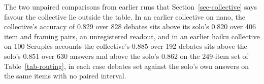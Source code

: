 The two unpaired comparisons from earlier runs that Section~\ref{sec-collective} says
favour the collective lie outside the table.
In an earlier collective on nano, the
collective's accuracy of 0.829 over 828 debates sits above its solo's 0.820
over 406 item and framing pairs, an unregistered readout, and in an earlier
haiku collective on 100 Scruples accounts the collective's 0.885 over 192
debates sits above the solo's 0.851 over 630
answers and above the solo's 0.862 on the 249-item set of
Table~\ref{tab-routing}, in each case debates set
against the solo's own answers on the same items with no paired interval.

